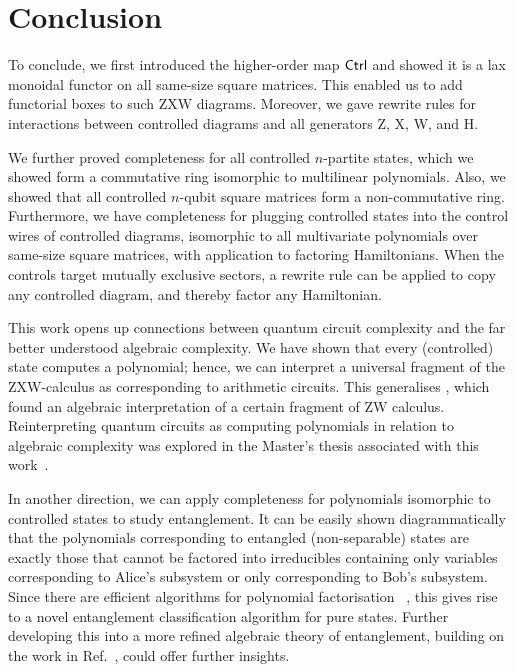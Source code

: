 \section{Conclusion}
To conclude, we first introduced the higher-order map $\textsf{Ctrl}$ and showed it is a lax monoidal functor on all same-size square matrices. This enabled us to add functorial boxes to such ZXW diagrams. Moreover, we gave rewrite rules for interactions between controlled diagrams and all generators Z, X, W, and H.

We further proved completeness for all controlled $n$-partite states, which we showed form a commutative ring isomorphic to multilinear polynomials. Also, we showed that all controlled $n$-qubit square matrices form a non-commutative ring. Furthermore, we have completeness for plugging controlled states into the control wires of controlled diagrams, isomorphic to all multivariate polynomials over same-size square matrices, with application to factoring Hamiltonians. When the controls target mutually exclusive sectors, a rewrite rule can be applied to copy any controlled diagram, and thereby factor any Hamiltonian.

This work opens up connections between quantum circuit complexity and the far better understood algebraic complexity.
We have shown that every (controlled) state computes a polynomial; hence, we can interpret a universal fragment of the ZXW-calculus as corresponding to arithmetic circuits. This generalises \cite{carette2023compositionality}, which found an algebraic interpretation of a certain fragment of ZW calculus. Reinterpreting quantum circuits as computing polynomials in relation to algebraic complexity was explored in the Master's thesis associated with this work~\cite{Agnew2023Masters}.

In another direction, we can apply completeness for polynomials isomorphic to controlled states to study entanglement. It can be easily shown diagrammatically that the polynomials corresponding to entangled (non-separable) states are exactly those that cannot be factored into irreducibles containing only variables corresponding to Alice's subsystem or only corresponding to Bob's subsystem. Since there are efficient algorithms for polynomial factorisation ~\cite{forbes2015complexity}, this gives rise to a novel entanglement classification algorithm for pure states. Further developing this into a more refined algebraic theory of entanglement, building on the work in Ref.~\cite{Agnew2023Masters}, could offer further insights.


